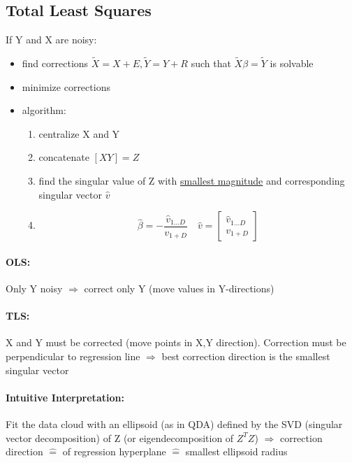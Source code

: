 \documentclass[11pt]{article}
\begin{document}
    \subsection{Total Least Squares}
    If Y and X are noisy:
    \begin{itemize}
      \item find corrections $\tilde{X}=X+E, \tilde{Y}=Y+R$ such that $\tilde{X}
      \beta=\tilde{Y}$ is solvable
      \item minimize corrections
      \item algorithm:
      \begin{enumerate}
        \item centralize X and Y
        \item concatenate $[X Y]=Z$
        \item find the singular value of Z with \underline{smallest magnitude}
        and corresponding singular vector $\hat{v}$
        \item
        \begin{equation*}
          \hat{\beta}=-\frac{\hat{v}_{1...D}} {v_{1+D}} \quad
          \hat{v} =
          \left[ \begin{array}{c}
            \hat{v}_{1...D} \\
            v_{1+D}
          \end{array}
          \right]
        \end{equation*}
      \end{enumerate}
      \end{itemize}
      \paragraph{OLS:} Only Y noisy $\Rightarrow$ correct only Y (move values
      in Y-directions)
      \paragraph{TLS:} X and Y must be corrected (move points in X,Y direction).
      Correction must be perpendicular to regression line $\Rightarrow$ best
      correction direction is the smallest singular vector
      \paragraph{Intuitive Interpretation:} Fit the data cloud with an ellipsoid
      (as in QDA) defined by the SVD (singular vector decomposition) of Z (or
      eigendecomposition of $Z^TZ$) $\Rightarrow$ correction direction $\widehat{=}$
       of regression hyperplane $\widehat{=}$ smallest ellipsoid radius
\end{document}
